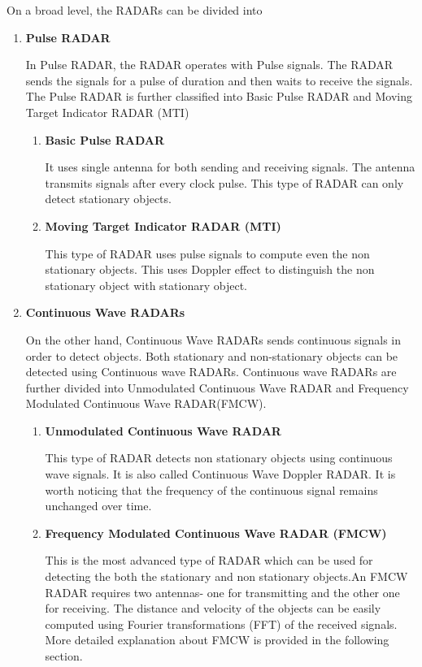 On a broad level, the RADARs can be divided into \begin{enumerate}
    \item \textbf{Pulse RADAR}
    
    In Pulse RADAR, the RADAR operates with Pulse signals. The RADAR sends the signals for a pulse of duration and then waits to receive the signals. The Pulse RADAR is further classified into Basic Pulse RADAR and Moving Target Indicator RADAR (MTI)
    \begin{enumerate}
    \item \textbf{Basic Pulse RADAR}
    
    It uses single antenna for both sending and receiving signals.  The antenna transmits signals after every clock pulse. This type of RADAR can only detect stationary objects.
    
    \item \textbf{Moving Target Indicator RADAR (MTI)}
    
    This type of RADAR uses pulse signals to compute even the non stationary objects. This uses Doppler effect to distinguish the non stationary object with stationary object.  
    
\end{enumerate}
    \item \textbf{Continuous Wave RADARs}
    
    On the other hand,  Continuous Wave RADARs sends continuous signals in order to detect objects. Both stationary and non-stationary objects can be detected using Continuous wave RADARs. Continuous wave RADARs are further divided into Unmodulated Continuous Wave RADAR  and Frequency Modulated Continuous Wave RADAR(FMCW).
    \begin{enumerate}

    \item \textbf{Unmodulated Continuous Wave RADAR}
   
    This type of RADAR detects non stationary objects using continuous wave signals. It is also called Continuous Wave Doppler RADAR. It is worth noticing that the frequency of the continuous signal remains unchanged over time.
    
    \item \textbf{Frequency Modulated Continuous Wave RADAR (FMCW)}
    
    This is the most advanced type of RADAR which can be used for detecting the both the stationary and non stationary objects.An FMCW RADAR requires two antennas- one for transmitting and the other one for receiving. The distance and velocity of the objects can be easily computed using Fourier transformations (FFT) of the received signals. More detailed explanation about FMCW is provided in the following section. 
\end{enumerate}
\end{enumerate} 







